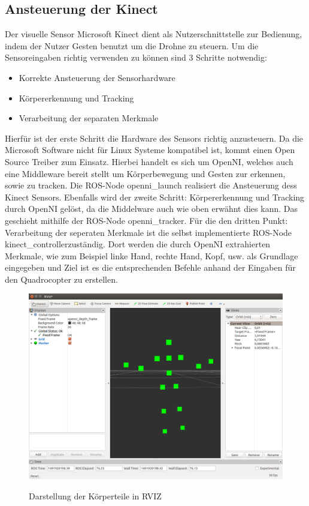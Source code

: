 \subsection{Ansteuerung der Kinect}
Der visuelle Sensor Microsoft Kinect dient als Nutzerschnittstelle zur Bedienung, indem der Nutzer Gesten benutzt um die Drohne zu steuern. Um die Sensoreingaben richtig verwenden zu können sind 3 Schritte notwendig:
\begin{itemize}
	\item Korrekte Ansteuerung der Sensorhardware
	\item Körpererkennung und Tracking
	\item Verarbeitung der separaten Merkmale
\end{itemize}
Hierfür ist der erste Schritt die Hardware des Sensors richtig anzusteuern. Da die Microsoft Software nicht für Linux Systeme kompatibel ist, kommt einen Open Source Treiber zum Einsatz. Hierbei handelt es sich um OpenNI\cite{openni}, welches auch eine Middleware bereit stellt um Körperbewegung und Gesten zur erkennen, sowie zu tracken. Die ROS-Node \grqq openni\_launch\grqq\cite{opennilaunch} realisiert die Ansteuerung dess Kinect Sensors. Ebenfalls wird der zweite Schritt: Körpererkennung und Tracking  durch OpenNI gelöst, da die Middelware auch wie oben erwähnt dies kann. Das geschieht mithilfe der ROS-Node \grqq openni\_tracker\grqq\cite{opennitracker}. Für die den dritten Punkt: Verarbeitung der seperaten Merkmale ist die selbst implementierte ROS-Node \grqq kinect\_controller\grqq \space zuständig. Dort werden die durch OpenNI extrahierten Merkmale, wie zum Beispiel linke Hand, rechte Hand, Kopf, usw. als Grundlage eingegeben und Ziel ist es die entsprechenden Befehle anhand der Eingaben für den Quadrocopter zu erstellen.
\begin{figure}[ht]
	\centering
	\includegraphics[scale=0.3]{Bilder/skeletonmarkers.png}
	\label{Darstellung der Körperteile in RVIZ}
	\caption{Darstellung der Körperteile in RVIZ}
\end{figure}
\newpage
